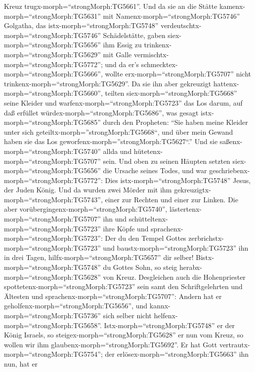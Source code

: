 Kreuz trugx-morph=``strongMorph:TG5661''.  Und da sie an
die Stätte kamenx-morph=``strongMorph:TG5631'' mit
Namenx-morph=``strongMorph:TG5746'' Golgatha, das
istx-morph=``strongMorph:TG5748''
verdeutschtx-morph=``strongMorph:TG5746'' Schädelstätte, 
gaben siex-morph=``strongMorph:TG5656'' ihm Essig zu
trinkenx-morph=``strongMorph:TG5629'' mit Galle
vermischtx-morph=``strongMorph:TG5772''; und da er's
schmecktex-morph=``strongMorph:TG5666'', wollte
erx-morph=``strongMorph:TG5707'' nicht
trinkenx-morph=``strongMorph:TG5629''.  Da sie ihn aber
gekreuzigt hattenx-morph=``strongMorph:TG5660'', teilten
siex-morph=``strongMorph:TG5668'' seine Kleider und
warfenx-morph=``strongMorph:TG5723'' das Los darum, auf daß erfüllet
würdex-morph=``strongMorph:TG5686'', was gesagt
istx-morph=``strongMorph:TG5685'' durch den Propheten: ``Sie haben meine
Kleider unter sich geteiltx-morph=''strongMorph:TG5668``, und über mein
Gewand haben sie das Los geworfenx-morph=''strongMorph:TG5627``.''
 Und sie saßenx-morph=``strongMorph:TG5740'' allda und
hütetenx-morph=``strongMorph:TG5707'' sein.  Und oben zu
seinen Häupten setzten siex-morph=``strongMorph:TG5656'' die Ursache
seines Todes, und war geschriebenx-morph=``strongMorph:TG5772'': Dies
istx-morph=``strongMorph:TG5748'' Jesus, der Juden König. 
Und da wurden zwei Mörder mit ihm
gekreuzigtx-morph=``strongMorph:TG5743'', einer zur Rechten und einer
zur Linken.  Die aber
vorübergingenx-morph=``strongMorph:TG5740'',
lästertenx-morph=``strongMorph:TG5707'' ihn und
schütteltenx-morph=``strongMorph:TG5723'' ihre Köpfe  und
sprachenx-morph=``strongMorph:TG5723'': Der du den Tempel Gottes
zerbrichstx-morph=``strongMorph:TG5723'' und
baustx-morph=``strongMorph:TG5723'' ihn in drei Tagen,
hilfx-morph=``strongMorph:TG5657'' dir selber!
Bistx-morph=``strongMorph:TG5748'' du Gottes Sohn, so steig
herabx-morph=``strongMorph:TG5628'' von Kreuz.  Desgleichen
auch die Hohenpriester spottetenx-morph=``strongMorph:TG5723'' sein samt
den Schriftgelehrten und Ältesten und
sprachenx-morph=``strongMorph:TG5707'':  Andern hat er
geholfenx-morph=``strongMorph:TG5656'', und
kannx-morph=``strongMorph:TG5736'' sich selber nicht
helfenx-morph=``strongMorph:TG5658''. Istx-morph=``strongMorph:TG5748''
er der König Israels, so steigex-morph=``strongMorph:TG5628'' er nun vom
Kreuz, so wollen wir ihm glaubenx-morph=``strongMorph:TG5692''.
 Er hat Gott vertrautx-morph=``strongMorph:TG5754''; der
erlösex-morph=``strongMorph:TG5663'' ihn nun, hat er
